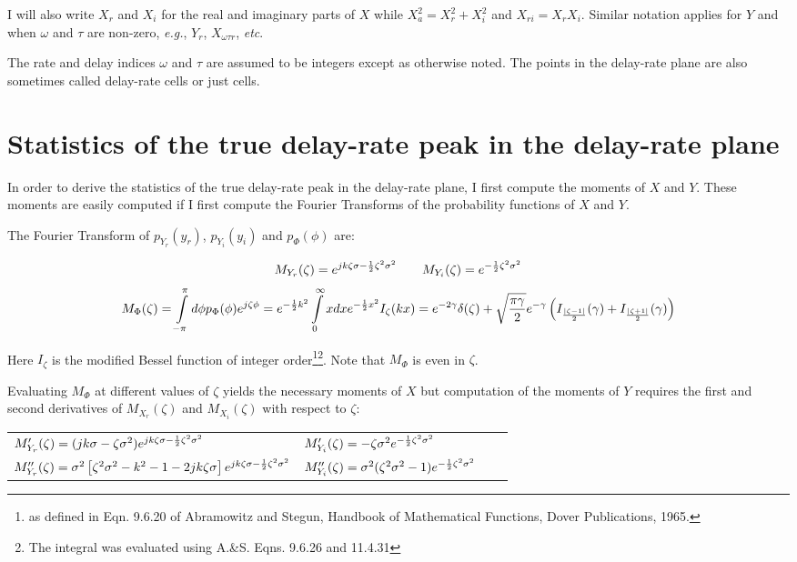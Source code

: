 I will also write $X_r$ and $X_i$ for the real and imaginary parts of
$X$ while $X_a^2 = X_r^2 + X_i^2$ and $X_{ri} = X_rX_i$.  Similar
notation applies for $Y$ and when $\omega$ and $\tau$ are non-zero, {\it e.g.}, $Y_r$, $X_{\omega\tau r}$, {\it etc}.

The rate and delay indices $\omega$ and $\tau$ are assumed to be
integers except as otherwise noted.  The points in the delay-rate
plane are also sometimes called delay-rate cells or just cells.

\section{Statistics of the true delay-rate peak in the delay-rate plane}

In order to derive the statistics of the true delay-rate peak in the
delay-rate plane, I first compute the moments of $X$ and $Y$.  These
moments are easily computed if I first compute the Fourier Transforms
of the probability functions of $X$ and $Y$.


The Fourier Transform of $p_{Y_r}(y_r)$, $p_{Y_i}(y_i)$ and $p_\Phi(\phi)$ are:

$$M_{Y_r}(\zeta) = e^{jk\zeta\sigma - {1\over2}\zeta^2\sigma^2} \qquad
  M_{Y_i}(\zeta) = e^{-{1\over2}\zeta^2\sigma^2}$$
$$M_\Phi(\zeta) = \int\limits_{-\pi}^\pi d\phi p_\Phi(\phi)e^{j\zeta\phi}
     = e^{-{1\over2}k^2}\int\limits_0^\infty xdxe^{-{1\over2}x^2}I_\zeta(kx)
     = e^{-2\gamma}\delta(\zeta) +
      \sqrt{\pi\gamma\over2}e^{-\gamma}
            \left(I_{|\zeta-1|\over2}(\gamma) +
                  I_{|\zeta+1|\over2}(\gamma) \right)$$

Here $I_\zeta$ is the modified Bessel function of integer
order\footnote{as defined in Eqn. 9.6.20 of Abramowitz and Stegun,
Handbook of Mathematical Functions, Dover Publications,
1965.}\footnote{The integral was evaluated using A.\&S. Eqns. 9.6.26
and 11.4.31}.  Note that $M_\Phi$ is even in $\zeta$.

Evaluating $M_{\Phi}$ at different values of $\zeta$ yields the
necessary moments of $X$ but computation of the moments of $Y$
requires the first and second derivatives of $M_{X_r}(\zeta)$ and
$M_{X_i}(\zeta)$ with respect to $\zeta$:

\vspace{-10pt}
\begin{center}
\begin{tabular}{llll}
$M_{Y_r}'(\zeta) = (jk\sigma-\zeta\sigma^2)e^{jk\zeta\sigma-{1\over2}\zeta^2\sigma^2} $&$
  M_{Y_i}'(\zeta) = -\zeta\sigma^2e^{-{1\over2}\zeta^2\sigma^2}$ \\
$M_{Y_r}''(\zeta) = \sigma^2\left[\zeta^2\sigma^2 - k^2 - 1 - 2jk\zeta\sigma\right]e^{jk\zeta\sigma - {1\over2}\zeta^2\sigma^2} $&$
  M_{Y_i}''(\zeta) = \sigma^2(\zeta^2\sigma^2-1)e^{-{1\over2}\zeta^2\sigma^2}$
\end{tabular}
\end{center}
\vspace{-10pt}

